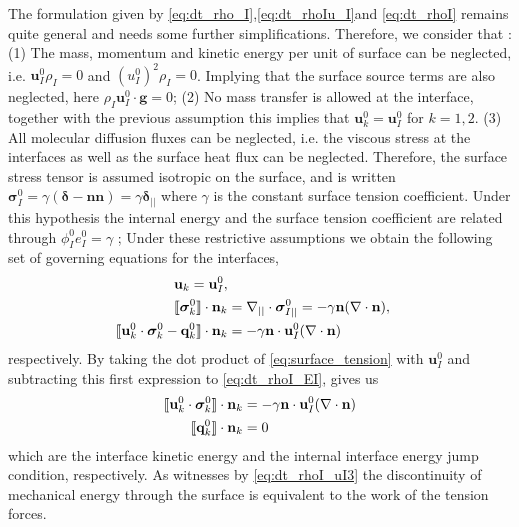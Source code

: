 The formulation given by \ref{eq:dt_rho_I},\ref{eq:dt_rhoIu_I}and \ref{eq:dt_rhoI} remains quite general and needs some further simplifications. 
Therefore, we consider that :
(1) The mass, momentum and kinetic energy per unit of surface can be neglected, i.e. $\textbf{u}_I^0\rho_I = 0 $ and $(u_I^0)^2\rho_I = 0$. 
Implying that the surface source terms are also neglected, here $\rho_I \textbf{u}_I^0\cdot \textbf{g} = 0$; 
(2) No mass transfer is allowed at the interface, together with the previous assumption this implies that $\textbf{u}_k^0 = \textbf{u}_I^0$ for $k = 1,2$. 
(3) All molecular diffusion fluxes can be neglected, i.e. the viscous stress at the interfaces as well as the surface heat flux can be neglected.
Therefore, the surface stress tensor is assumed isotropic on the surface, and is written $\bm{\sigma}_I^0  = \gamma (\bm\delta - \textbf{nn}) = \gamma \bm\delta_{||}$ where $\gamma$ is the constant surface tension coefficient.
Under this hypothesis the internal energy and the surface tension coefficient are related through $\phi_I^0 e_I^0 = \gamma$ \cite{ishii2010thermo};
Under these restrictive assumptions we obtain the following set of governing equations for the interfaces,
\begin{align}
    \label{eq:dt_rho_I}
    \textbf{u}_k = \textbf{u}_I^0, \\
    \llbracket \bm{\sigma}_k^0 \rrbracket \cdot \textbf{n}_k 
    &=
    \mathbf{\nabla}_{||}\cdot\bm\sigma^0_{I||}
    =
    -\gamma\textbf{n}(\mathbf{\nabla}\cdot \textbf{n}),
    \label{eq:surface_tension}\\
    \label{eq:dt_rhoI_EI}
    \llbracket \textbf{u}_k^0 \cdot \bm{\sigma}_k^0 - \textbf{q}_k^0 \rrbracket \cdot \textbf{n}_k
    &=
    -\gamma\textbf{n}\cdot \textbf{u}_{I}^0(\mathbf{\nabla}\cdot \textbf{n})
\end{align}
respectively. 
By taking the dot product of \ref{eq:surface_tension} with $\textbf{u}_I^0$ and subtracting this first expression to \ref{eq:dt_rhoI_EI}, gives us
\begin{align}
    \label{eq:dt_rhoI_uI3}
    \llbracket \textbf{u}_k^0 \cdot \bm{\sigma}_k^0 \rrbracket \cdot \textbf{n}_k
    &=
    -\gamma\textbf{n}\cdot \textbf{u}_{I}^0(\mathbf{\nabla}\cdot \textbf{n})\\
    \label{eq:dt_rhoIe_I}
    \llbracket  \textbf{q}_k^0 \rrbracket \cdot \textbf{n}_k
    &= 
     0
\end{align}
which are the interface kinetic energy and the internal interface energy jump condition, respectively. 
As witnesses by \ref{eq:dt_rhoI_uI3} the discontinuity of mechanical energy through the surface is equivalent to the work of the tension forces. 

